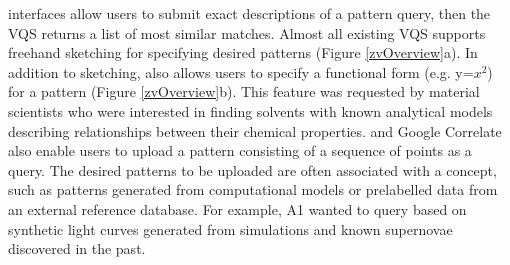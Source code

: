  interfaces allow users to submit exact descriptions of a pattern query, then the VQS returns a list of most similar matches. Almost all existing VQS supports freehand sketching for specifying desired patterns (Figure \ref{zvOverview}a). In addition to sketching, \zv also allows users to specify a functional form (e.g. y=$x^2$) for a pattern (Figure \ref{zvOverview}b). This feature was requested by material scientists who were interested in finding solvents with known analytical models describing relationships between their chemical properties. \zv and Google Correlate also enable users to upload a pattern consisting of a sequence of points as a query. The desired patterns to be uploaded are often associated with a concept, such as patterns generated from computational models or prelabelled data from an external reference database. For example, A1 wanted to query based on synthetic light curves generated from simulations and known supernovae discovered in the past.
